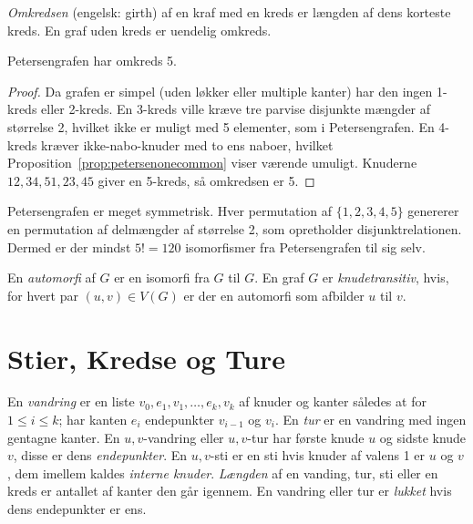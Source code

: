 \begin{definition}[Omkreds]
	\textit{Omkredsen} (engelsk: girth) af en kraf med en kreds er længden af dens korteste kreds. En graf uden kreds er uendelig omkreds.
\end{definition}

\begin{corollary}
	Petersengrafen har omkreds 5.
\end{corollary}
\begin{proof}
	Da grafen er simpel (uden løkker eller multiple kanter) har den ingen 1-kreds eller 2-kreds. En 3-kreds ville kræve tre parvise disjunkte mængder af størrelse 2, hvilket ikke er muligt med 5 elementer, som i Petersengrafen.
	En 4-kreds kræver ikke-nabo-knuder med to ens naboer, hvilket Proposition~\ref{prop:petersenonecommon} viser værende umuligt.
	Knuderne $12, 34, 51, 23, 45$ giver en 5-kreds, så omkredsen er 5.
\end{proof}

Petersengrafen er meget symmetrisk. Hver permutation af $\{1,2,3,4,5\}$ genererer en permutation af delmængder af størrelse 2, som opretholder disjunktrelationen. Dermed er der mindst $5! = 120$ isomorfismer fra Petersengrafen til sig selv.

\begin{definition}
	En \textit{automorfi} af $G$ er en isomorfi fra $G$ til $G$. En graf $G$ er \textit{knudetransitiv}, hvis, for hvert par $(u,v) \in V(G)$ er der en automorfi som afbilder $u$ til $v$.
\end{definition}

\section{Stier, Kredse og Ture}%
\label{sec:label}

\begin{definition}
	En \textit{vandring} er en liste $v_{0},e_{1},v_{1}, \ldots, e_{k}, v_{k}$ af knuder og kanter således at for $1 \le i \le k$; har kanten $e_{i}$ endepunkter $v_{i-1}$ og $v_{i}$. En \textit{tur} er en vandring med ingen gentagne kanter. En $u,v$-vandring eller $u,v$-tur har første knude $u$ og sidste knude $v$, disse er dens \textit{endepunkter}. En $u,v$-sti er en sti hvis knuder af valens 1 er $u$ og $v$, dem imellem kaldes \textit{interne knuder}. \textit{Længden} af en vanding, tur, sti eller en kreds er antallet af kanter den går igennem. En vandring eller tur er \textit{lukket} hvis dens endepunkter er ens.
\end{definition}

